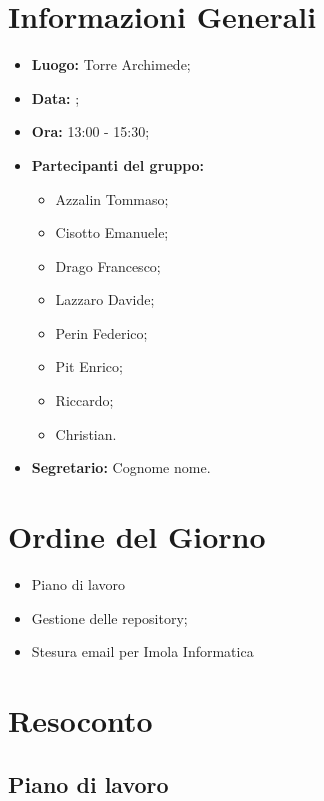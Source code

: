 \documentclass[a4paper, oneside, dvipsnames, table]{article}
\begin{document}
\copertina{}
\newpage



\clearpage
\tableofcontents
\clearpage



\section{Informazioni Generali}
\begin{itemize}
\item \textbf{Luogo:} Torre Archimede;
\item \textbf{Data:} \Data;
\item \textbf{Ora:} 13:00 - 15:30;
\item \textbf{Partecipanti del gruppo:}
	\begin{itemize}
	\item Azzalin Tommaso; 
	\item Cisotto Emanuele; 
	\item Drago Francesco;
	\item Lazzaro Davide;
	\item Perin Federico;
	\item Pit Enrico;
	\item Riccardo;
	\item Christian.
	\end{itemize} 
\item \textbf{Segretario:} Cognome nome.
\end{itemize}

\clearpage

\section{Ordine del Giorno}
\begin{itemize}
\item Piano di lavoro
\item Gestione delle repository;
\item Stesura email per Imola Informatica
\end{itemize}

\clearpage

\section{Resoconto}
\subsection{Piano di lavoro}
\end{document}
